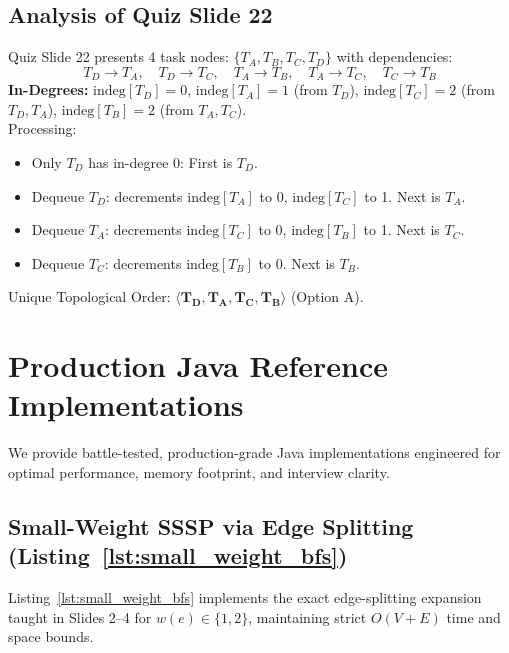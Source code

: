 \documentclass[10pt,journal,compsoc,onecolumn]{IEEEtran}
\begin{document}
\subsection{Analysis of Quiz Slide 22}
Quiz Slide 22 presents 4 task nodes: $\{T_A, T_B, T_C, T_D\}$ with dependencies:
\begin{equation*}
T_D \to T_A, \quad T_D \to T_C, \quad T_A \to T_B, \quad T_A \to T_C, \quad T_C \to T_B
\end{equation*}
\textbf{In-Degrees:} $\text{indeg}[T_D] = 0$, $\text{indeg}[T_A] = 1$ (from $T_D$), $\text{indeg}[T_C] = 2$ (from $T_D, T_A$), $\text{indeg}[T_B] = 2$ (from $T_A, T_C$). \\
Processing:
\begin{itemize}
    \item Only $T_D$ has in-degree 0: First is $T_D$.
    \item Dequeue $T_D$: decrements $\text{indeg}[T_A]$ to 0, $\text{indeg}[T_C]$ to 1. Next is $T_A$.
    \item Dequeue $T_A$: decrements $\text{indeg}[T_C]$ to 0, $\text{indeg}[T_B]$ to 1. Next is $T_C$.
    \item Dequeue $T_C$: decrements $\text{indeg}[T_B]$ to 0. Next is $T_B$.
\end{itemize}
Unique Topological Order: $\mathbf{\langle T_D, T_A, T_C, T_B \rangle}$ (Option A).

\section{Production Java Reference Implementations}
\label{sec:java_implementations}

We provide battle-tested, production-grade Java implementations engineered for optimal performance, memory footprint, and interview clarity.

\subsection{Small-Weight SSSP via Edge Splitting (Listing~\ref{lst:small_weight_bfs})}
Listing~\ref{lst:small_weight_bfs} implements the exact edge-splitting expansion taught in Slides 2--4 for $w(e) \in \{1, 2\}$, maintaining strict $O(V + E)$ time and space bounds.
\end{document}

